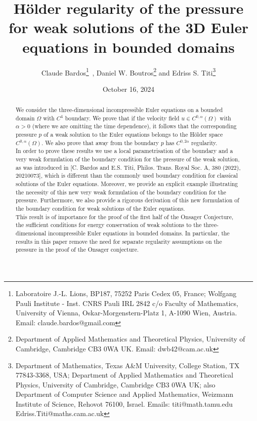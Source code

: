 \documentclass[12pt,a4paper]{article}
\theoremstyle{definition}
\theoremstyle{remark}
\numberwithin{equation}{section}
\begin{document}
	
\title{H\"older regularity of the pressure for weak solutions of the 3D Euler equations in bounded domains}
	
\author[]{Claude Bardos\footnote{Laboratoire J.-L. Lions, BP187, 75252 Paris Cedex 05, France; Wolfgang Pauli Institute - Inst. CNRS Pauli IRL 2842 c/o Faculty of Mathematics, University of Vienna, Oskar-Morgenstern-Platz 1, A-1090 Wien, Austria. Email: \textsf{claude.bardos@gmail.com}} \,, Daniel W. Boutros\footnote{Department of Applied Mathematics and Theoretical Physics, University of Cambridge, Cambridge CB3 0WA UK. Email: \textsf{dwb42@cam.ac.uk}} \space and Edriss S. Titi\footnote{Department of Mathematics, Texas A\&M University, College Station, TX 77843-3368, USA; Department of Applied Mathematics and Theoretical Physics, University of Cambridge, Cambridge CB3 0WA UK; also Department of Computer Science and Applied Mathematics, Weizmann Institute of Science, Rehovot 76100, Israel. Emails: \textsf{titi@math.tamu.edu} \; \textsf{Edriss.Titi@maths.cam.ac.uk}}}



\date{October 16, 2024} 
	
\maketitle

\begin{abstract}
We consider the three-dimensional incompressible Euler equations on a bounded domain $\Omega$ with $C^4$ boundary. We prove that if the velocity field $u \in C^{0,\alpha} (\Omega)$ with $\alpha > 0$ (where we are omitting the time dependence), it follows that the corresponding pressure $p$ of a weak solution to the Euler equations belongs to the Hölder space $C^{0, \alpha} (\Omega)$. We also prove that away from the boundary $p$ has $C^{0,2\alpha}$ regularity. \\
In order to prove these results we use a local parametrisation of the boundary and a very weak formulation of the boundary condition for the pressure of the weak solution, as was introduced in [C. Bardos and E.S. Titi, Philos. Trans. Royal Soc. A, 380 (2022), 20210073], which is different than the commonly used boundary condition for classical solutions of the Euler equations. Moreover, we provide an explicit example illustrating the necessity of this new very weak formulation of the boundary condition for the pressure. Furthermore, we also provide a rigorous derivation of this new formulation of the boundary condition for weak solutions of the Euler equations. \\
This result is of importance for the proof of the first half of the Onsager Conjecture, the sufficient conditions for energy conservation of weak solutions to the three-dimensional incompressible Euler equations in bounded domains. In particular, the results in this paper remove the need for separate regularity assumptions on the pressure in the proof of the Onsager conjecture. 
\end{abstract}
\end{document}
